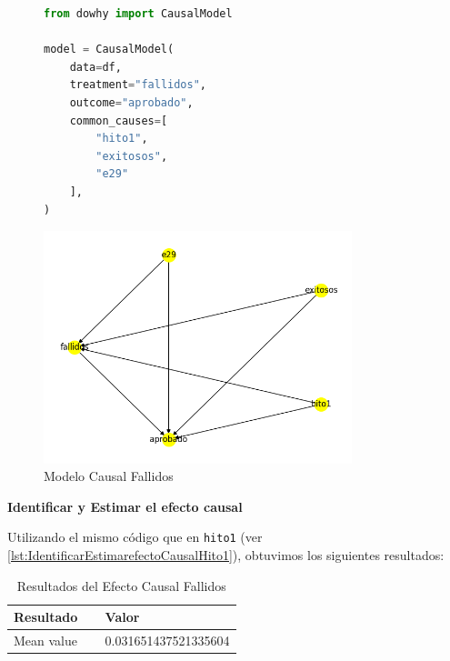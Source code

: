 \begin{figure}[H]
    \centering
    \begin{minipage}{0.48\textwidth}
        \begin{lstlisting}[language=Python, caption=Modelo causal fallidos, label=lst:model_causalFallidos]
from dowhy import CausalModel

model = CausalModel(
    data=df,
    treatment="fallidos",
    outcome="aprobado",
    common_causes=[
        "hito1",
        "exitosos",
        "e29"
    ],
)
        \end{lstlisting}
    \end{minipage}
    \hfill
    \begin{minipage}{0.48\textwidth}
        \centering
        \includegraphics[width=0.8\textwidth]{img/causalidad/graph_causal_model_fallidos.png}
        \caption{Modelo Causal Fallidos}
        \label{fig:modelo_causal_Fallidos}
    \end{minipage}
\end{figure}

\textbf{Identificar y Estimar el efecto causal}

Utilizando el mismo código que en \texttt{hito1} (ver \ref{lst:IdentificarEstimarefectoCausalHito1}), obtuvimos los siguientes resultados:

\begin{table}[H]
    \centering        
    \begin{tabular}{lp{0.6\linewidth}}
        \toprule
        \textbf{Resultado} & \textbf{Valor} \\
        \midrule
        Mean value & 0.031651437521335604 \\
        \bottomrule
    \end{tabular}
    \caption{Resultados del Efecto Causal Fallidos}
    \label{tab:efecto_causal_Fallidos}
\end{table}

